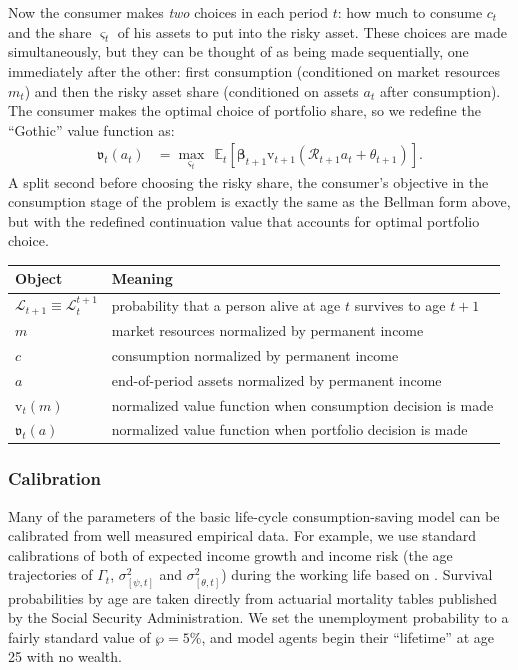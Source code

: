 \documentclass[12pt,letterpaper, fleqn]{article}
\newcommand{\Rport}{\mathcal{R}}
\newcommand{\vFunc}{\mathrm{v}}
\newcommand{\Alive}{\mathcal{L}}
\newcommand{\Ex}{\mathbb{E}}
\newcommand{\permGroFac}{\Gamma}
\newcommand{\permShk}{\psi}
\newcommand{\tranShk}{\theta}
\newcommand{\pZero}{\wp}
\newcommand{\cNrm}{c}
\newcommand{\mNrm}{m}
\newcommand{\aNrm}{a}
\begin{document}
Now the consumer makes \textit{two} choices in each period $t$: how much to consume $\cNrm_t$ and the share $\varsigma_t$ of his assets to put into the risky asset.
These choices are made simultaneously, but they can be thought of as being made sequentially, one immediately after the other: first consumption (conditioned on market resources $\mNrm_t$) and then the risky asset share (conditioned on assets $\aNrm_t$ after consumption).
The consumer makes the optimal choice of portfolio share, so we redefine the ``Gothic'' value function as:
\begin{align}
\mathfrak{v}_{t}(\aNrm_t) & = \max_{\varsigma_t}~~ \Ex_{t}\left[ \pmb{\beta}_{t+1} \vFunc_{t+1}(\Rport_{t+1} \aNrm_t + \theta_{t+1}) \right].
\end{align}
A split second before choosing the risky share, the consumer's objective in the consumption stage of the problem is exactly the same as the Bellman form above, but with the redefined continuation value that accounts for optimal portfolio choice.

\begin{exhibit}[t!]
\centering
\caption{Summary of Life-Cycle Model Notation}
\begin{tabular}{ll}
\toprule
Object & Meaning \\
\midrule
$\Alive_{t+1} \equiv \Alive_{t}^{t+1}$ & probability that a person alive at age $t$ survives to age $t+1$ \\
$\mNrm$ & market resources normalized by permanent income\\
$\cNrm$ & consumption normalized by permanent income \\
$\aNrm$ & end-of-period assets normalized by permanent income \\
$\vFunc_{t}(\mNrm)$ & normalized value function when consumption decision is made \\
$\mathfrak{v}_{t}(\aNrm)$ & normalized value function when portfolio decision is made \\
\bottomrule
\end{tabular}
\end{exhibit}

\subsubsection{Calibration}

Many of the parameters of the basic life-cycle consumption-saving model can be calibrated from well measured empirical data.
For example, we use standard calibrations of both of expected income growth and income risk (the age trajectories of $\permGroFac_t$, $\sigma_{[\permShk, t]}^2$ and $\sigma_{[\tranShk, t]}^2$) during the working life based on \cite{Cagetti2003}.
Survival probabilities by age are taken directly from actuarial mortality tables published by the Social Security Administration.
We set the unemployment probability to a fairly standard value of $\pZero = 5\%$, and
model agents begin their ``lifetime'' at age 25 with no wealth.
\end{document}
